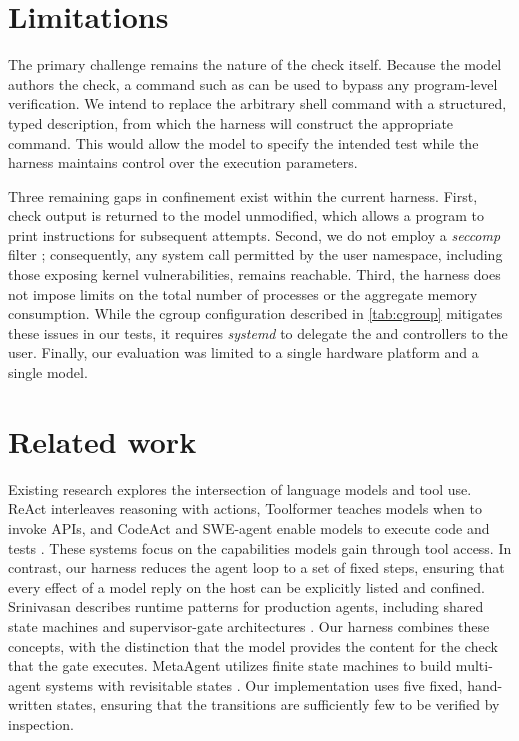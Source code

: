 \documentclass[10pt,twocolumn,a4paper]{article}
\begin{document}
\section{Limitations}
\label{sec:limits}

The primary challenge remains the nature of the check itself. Because the model authors the check, a command such as  can be used to bypass any program-level verification. We intend to replace the arbitrary shell command with a structured, typed description, from which the harness will construct the appropriate command. This would allow the model to specify the intended test while the harness maintains control over the execution parameters.

Three remaining gaps in confinement exist within the current harness. First, check output is returned to the model unmodified, which allows a program to print instructions for subsequent attempts. Second, we do not employ a \emph{seccomp} filter \cite{seccomp2}; consequently, any system call permitted by the user namespace, including those exposing kernel vulnerabilities, remains reachable. Third, the harness does not impose limits on the total number of processes or the aggregate memory consumption. While the cgroup configuration described in \cref{tab:cgroup} mitigates these issues in our tests, it requires \emph{systemd} to delegate the  and  controllers to the user. Finally, our evaluation was limited to a single hardware platform and a single model.

\section{Related work}

Existing research explores the intersection of language models and tool use. ReAct interleaves reasoning with actions, Toolformer teaches models when to invoke APIs, and CodeAct and SWE-agent enable models to execute code and tests \cite{react2023,toolformer2023,codeact2024,sweagent2024}. These systems focus on the capabilities models gain through tool access. In contrast, our harness reduces the agent loop to a set of fixed steps, ensuring that every effect of a model reply on the host can be explicitly listed and confined. Srinivasan describes runtime patterns for production agents, including shared state machines and supervisor-gate architectures \cite{sdb2026}. Our harness combines these concepts, with the distinction that the model provides the content for the check that the gate executes. MetaAgent utilizes finite state machines to build multi-agent systems with revisitable states \cite{metaagent2025}. Our implementation uses five fixed, hand-written states, ensuring that the transitions are sufficiently few to be verified by inspection.
\end{document}
